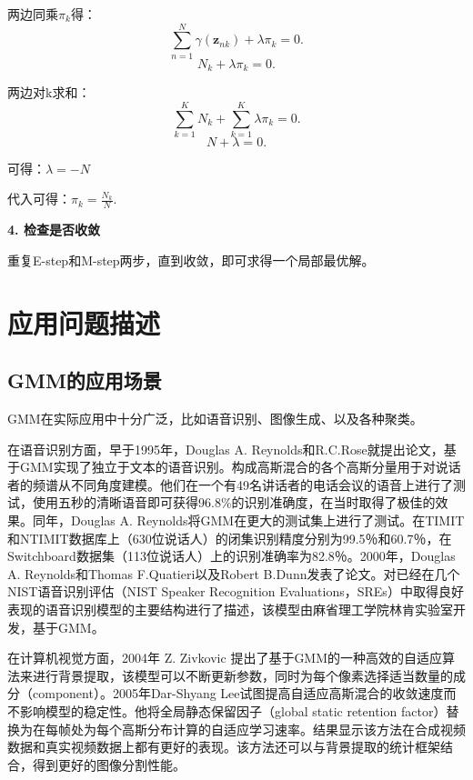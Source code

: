 \documentclass[UTF8]{ctexart}
\begin{document}
两边同乘$\pi_k$得：
\begin{equation}
  \sum_{n=1}^N\gamma (\mathbf z_{nk}) + \lambda\pi_k=0.
\end{equation}
\begin{equation}
  N_k+\lambda\pi_k=0.
\end{equation}

两边对k求和：
\begin{equation}
  \sum_{k=1}^KN_k+\sum_{k=1}^K\lambda\pi_k=0.
\end{equation}
\begin{equation}
  N+\lambda=0.
\end{equation}

可得：$\lambda=-N$

代入可得：$\pi_k=\frac{N_k}{N}.$

\textbf{4. 检查是否收敛}

重复E-step和M-step两步，直到收敛，即可求得一个局部最优解。


\section{应用问题描述}

\subsection{GMM的应用场景}

GMM在实际应用中十分广泛，比如语音识别、图像生成、以及各种聚类。

在语音识别方面，早于1995年，Douglas A. Reynolds和R.C.Rose就提出论文，基于GMM实现了独立于文本的语音识别。构成高斯混合的各个高斯分量用于对说话者的频谱从不同角度建模。他们在一个有49名讲话者的电话会议的语音上进行了测试，使用五秒的清晰语音即可获得96.8\%的识别准确度，在当时取得了极佳的效果。同年，Douglas A. Reynolds将GMM在更大的测试集上进行了测试。在TIMIT和NTIMIT数据库上（630位说话人）的闭集识别精度分别为99.5％和60.7％，在Switchboard数据集（113位说话人）上的识别准确率为82.8％。2000年，Douglas A. Reynolds和Thomas F.Quatieri以及Robert B.Dunn发表了论文。对已经在几个NIST语音识别评估（NIST Speaker Recognition Evaluations，SREs）中取得良好表现的语音识别模型的主要结构进行了描述，该模型由麻省理工学院林肯实验室开发，基于GMM。

在计算机视觉方面，2004年 Z. Zivkovic 提出了基于GMM的一种高效的自适应算法来进行背景提取，该模型可以不断更新参数，同时为每个像素选择适当数量的成分（component）。2005年Dar-Shyang Lee试图提高自适应高斯混合的收敛速度而不影响模型的稳定性。他将全局静态保留因子（global static retention factor）替换为在每帧处为每个高斯分布计算的自适应学习速率。结果显示该方法在合成视频数据和真实视频数据上都有更好的表现。该方法还可以与背景提取的统计框架结合，得到更好的图像分割性能。
\end{document}
